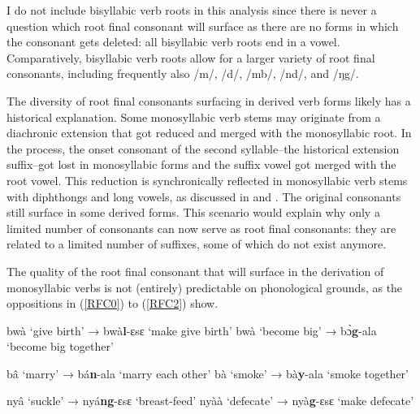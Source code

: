 \noindent  I do not include bisyllabic verb roots in this analysis since there is never a question which root final consonant will surface as there are no forms in which the consonant gets deleted: all bisyllabic verb roots end in a vowel. Comparatively, bisyllabic verb roots allow for a larger variety of root final consonants, including frequently also /m/, /d/, /mb/, /nd/, and /ŋg/.

The diversity of root final consonants surfacing in derived verb forms likely has a historical explanation. Some monosyllabic verb stems may originate from a diachronic extension that got reduced and merged with the monosyllabic root. In the process, the onset consonant of the second syllable--the historical extension suffix--got lost in monosyllabic forms and the suffix vowel got merged with the root vowel.  This reduction is synchronically reflected in monosyllabic verb stems with diphthongs and long vowels, as discussed in  and . The original consonants still surface in some derived forms. This scenario would explain why only a limited number of consonants can now serve as root final consonants: they are related to a limited number of suffixes, some of which do not exist anymore.

The quality of the root final consonant that will surface in the derivation of monosyllabic verbs is not (entirely) predictable on  phonological grounds, as the oppositions in (\ref{RFC0}) to (\ref{RFC2}) show.

\begin{exe}
\ex\label{RFC0}
\begin{xlist}
\ex bwà `give birth'  → bwà{\bfseries l}-ɛsɛ `make give birth'
\ex bwà `become big' → bɔ̀{\bfseries g}-ala `become big together'
\end{xlist}
\end{exe}

\begin{exe}
\ex\label{RFC1}
\begin{xlist}
\ex bâ `marry'  → bá{\bfseries n}-ala `marry each other'
\ex bà `smoke' → bà{\bfseries y}-ala `smoke together'
\end{xlist}
\end{exe}

\begin{exe}
\ex\label{RFC2}
\begin{xlist}
\ex nyâ `suckle'  → nyá{\bfseries ng}-ɛsɛ `breast-feed'
\ex nyàà `defecate' → nyà{\bfseries g}-ɛsɛ `make defecate'
\end{xlist}
\end{exe}

